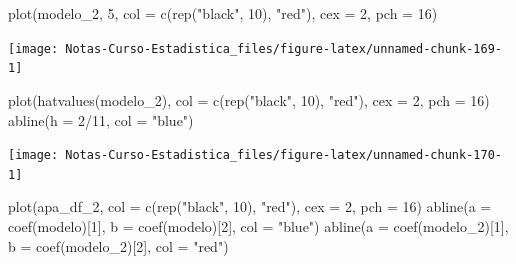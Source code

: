 \documentclass[
  12pt,
]{book}
\newenvironment{Shaded}{\begin{snugshade}}{\end{snugshade}}
\newcommand{\AttributeTok}[1]{\textcolor[rgb]{0.77,0.63,0.00}{#1}}
\newcommand{\DecValTok}[1]{\textcolor[rgb]{0.00,0.00,0.81}{#1}}
\newcommand{\FunctionTok}[1]{\textcolor[rgb]{0.00,0.00,0.00}{#1}}
\newcommand{\NormalTok}[1]{#1}
\newcommand{\SpecialCharTok}[1]{\textcolor[rgb]{0.00,0.00,0.00}{#1}}
\newcommand{\StringTok}[1]{\textcolor[rgb]{0.31,0.60,0.02}{#1}}
\begin{document}
\begin{Shaded}
\begin{Highlighting}[]
\FunctionTok{plot}\NormalTok{(modelo\_2, }\DecValTok{5}\NormalTok{, }\AttributeTok{col =} \FunctionTok{c}\NormalTok{(}\FunctionTok{rep}\NormalTok{(}\StringTok{"black"}\NormalTok{, }\DecValTok{10}\NormalTok{), }\StringTok{"red"}\NormalTok{),}
    \AttributeTok{cex =} \DecValTok{2}\NormalTok{, }\AttributeTok{pch =} \DecValTok{16}\NormalTok{)}
\end{Highlighting}
\end{Shaded}

\begin{center}\texttt{[image: Notas-Curso-Estadistica\_files/figure-latex/unnamed-chunk-169-1]} \end{center}

\begin{Shaded}
\begin{Highlighting}[]
\FunctionTok{plot}\NormalTok{(}\FunctionTok{hatvalues}\NormalTok{(modelo\_2), }\AttributeTok{col =} \FunctionTok{c}\NormalTok{(}\FunctionTok{rep}\NormalTok{(}\StringTok{"black"}\NormalTok{, }\DecValTok{10}\NormalTok{),}
    \StringTok{"red"}\NormalTok{), }\AttributeTok{cex =} \DecValTok{2}\NormalTok{, }\AttributeTok{pch =} \DecValTok{16}\NormalTok{)}
\FunctionTok{abline}\NormalTok{(}\AttributeTok{h =} \DecValTok{2}\SpecialCharTok{/}\DecValTok{11}\NormalTok{, }\AttributeTok{col =} \StringTok{"blue"}\NormalTok{)}
\end{Highlighting}
\end{Shaded}

\begin{center}\texttt{[image: Notas-Curso-Estadistica\_files/figure-latex/unnamed-chunk-170-1]} \end{center}

\begin{Shaded}
\begin{Highlighting}[]
\FunctionTok{plot}\NormalTok{(apa\_df\_2, }\AttributeTok{col =} \FunctionTok{c}\NormalTok{(}\FunctionTok{rep}\NormalTok{(}\StringTok{"black"}\NormalTok{, }\DecValTok{10}\NormalTok{), }\StringTok{"red"}\NormalTok{), }\AttributeTok{cex =} \DecValTok{2}\NormalTok{,}
    \AttributeTok{pch =} \DecValTok{16}\NormalTok{)}
\FunctionTok{abline}\NormalTok{(}\AttributeTok{a =} \FunctionTok{coef}\NormalTok{(modelo)[}\DecValTok{1}\NormalTok{], }\AttributeTok{b =} \FunctionTok{coef}\NormalTok{(modelo)[}\DecValTok{2}\NormalTok{], }\AttributeTok{col =} \StringTok{"blue"}\NormalTok{)}
\FunctionTok{abline}\NormalTok{(}\AttributeTok{a =} \FunctionTok{coef}\NormalTok{(modelo\_2)[}\DecValTok{1}\NormalTok{], }\AttributeTok{b =} \FunctionTok{coef}\NormalTok{(modelo\_2)[}\DecValTok{2}\NormalTok{],}
    \AttributeTok{col =} \StringTok{"red"}\NormalTok{)}
\end{Highlighting}
\end{Shaded}
\end{document}
